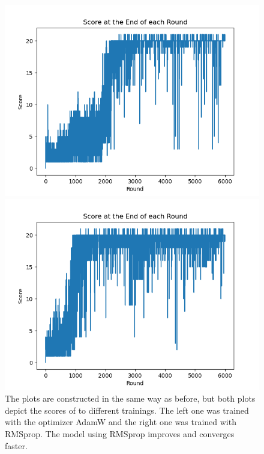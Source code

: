 \begin{figure}[H]
    \centering
    \begin{minipage}{0.49\textwidth}
		\centering
		\includegraphics[scale=0.52]{images/scores_adamw.png}
    \end{minipage}
    \begin{minipage}{0.49\textwidth}
	\centering
		\includegraphics[scale=0.52]{images/scores_rmsprop.png}
    \end{minipage}
    \caption{The plots are constructed in the same way as before, but both plots depict the scores of to different trainings. The left one was trained with the optimizer AdamW and the right one was trained with RMSprop. The model using RMSprop improves and converges faster.}
    \label{fig:adamvsrmsprop}
\end{figure}

